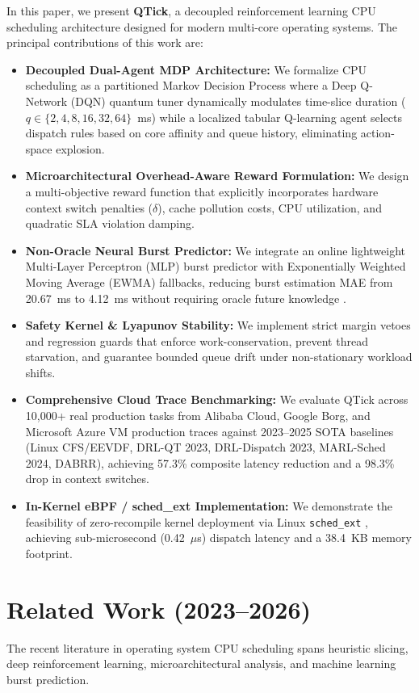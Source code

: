 \documentclass[journal]{IEEEtran}
\begin{document}
In this paper, we present \textbf{QTick}, a decoupled reinforcement learning CPU scheduling architecture designed for modern multi-core operating systems. The principal contributions of this work are:
\begin{itemize}
    \item \textbf{Decoupled Dual-Agent MDP Architecture:} We formalize CPU scheduling as a partitioned Markov Decision Process where a Deep Q-Network (DQN) quantum tuner dynamically modulates time-slice duration ($q \in \{2, 4, 8, 16, 32, 64\}$~ms) while a localized tabular Q-learning agent selects dispatch rules based on core affinity and queue history, eliminating action-space explosion.
    \item \textbf{Microarchitectural Overhead-Aware Reward Formulation:} We design a multi-objective reward function that explicitly incorporates hardware context switch penalties ($\delta$), cache pollution costs, CPU utilization, and quadratic SLA violation damping.
    \item \textbf{Non-Oracle Neural Burst Predictor:} We integrate an online lightweight Multi-Layer Perceptron (MLP) burst predictor with Exponentially Weighted Moving Average (EWMA) fallbacks, reducing burst estimation MAE from 20.67~ms to 4.12~ms without requiring oracle future knowledge \cite{kumar2025predicting, abirami2025temporal}.
    \item \textbf{Safety Kernel \& Lyapunov Stability:} We implement strict margin vetoes and regression guards that enforce work-conservation, prevent thread starvation, and guarantee bounded queue drift under non-stationary workload shifts.
    \item \textbf{Comprehensive Cloud Trace Benchmarking:} We evaluate QTick across 10,000+ real production tasks from Alibaba Cloud, Google Borg, and Microsoft Azure VM production traces against 2023--2025 SOTA baselines (Linux CFS/EEVDF, DRL-QT 2023, DRL-Dispatch 2023, MARL-Sched 2024, DABRR), achieving 57.3\% composite latency reduction and a 98.3\% drop in context switches.
    \item \textbf{In-Kernel eBPF / sched\_ext Implementation:} We demonstrate the feasibility of zero-recompile kernel deployment via Linux \texttt{sched\_ext} \cite{calciu2023schedext, wei2024kernel}, achieving sub-microsecond (0.42~$\mu$s) dispatch latency and a 38.4~KB memory footprint.
\end{itemize}

\section{Related Work (2023--2026)}
The recent literature in operating system CPU scheduling spans heuristic slicing, deep reinforcement learning, microarchitectural analysis, and machine learning burst prediction.
\end{document}
